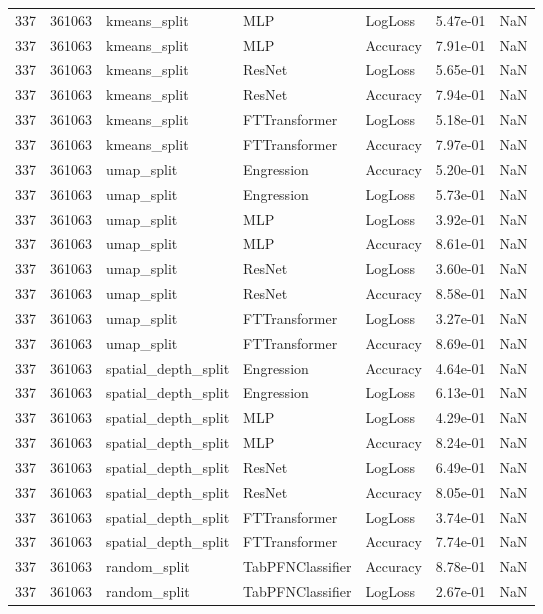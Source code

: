 \begin{tabular}{rrlllrr}
337 & 361063 & kmeans\_split & MLP & LogLoss & 5.47e-01 & NaN \\
337 & 361063 & kmeans\_split & MLP & Accuracy & 7.91e-01 & NaN \\
337 & 361063 & kmeans\_split & ResNet & LogLoss & 5.65e-01 & NaN \\
337 & 361063 & kmeans\_split & ResNet & Accuracy & 7.94e-01 & NaN \\
337 & 361063 & kmeans\_split & FTTransformer & LogLoss & 5.18e-01 & NaN \\
337 & 361063 & kmeans\_split & FTTransformer & Accuracy & 7.97e-01 & NaN \\
337 & 361063 & umap\_split & Engression & Accuracy & 5.20e-01 & NaN \\
337 & 361063 & umap\_split & Engression & LogLoss & 5.73e-01 & NaN \\
337 & 361063 & umap\_split & MLP & LogLoss & 3.92e-01 & NaN \\
337 & 361063 & umap\_split & MLP & Accuracy & 8.61e-01 & NaN \\
337 & 361063 & umap\_split & ResNet & LogLoss & 3.60e-01 & NaN \\
337 & 361063 & umap\_split & ResNet & Accuracy & 8.58e-01 & NaN \\
337 & 361063 & umap\_split & FTTransformer & LogLoss & 3.27e-01 & NaN \\
337 & 361063 & umap\_split & FTTransformer & Accuracy & 8.69e-01 & NaN \\
337 & 361063 & spatial\_depth\_split & Engression & Accuracy & 4.64e-01 & NaN \\
337 & 361063 & spatial\_depth\_split & Engression & LogLoss & 6.13e-01 & NaN \\
337 & 361063 & spatial\_depth\_split & MLP & LogLoss & 4.29e-01 & NaN \\
337 & 361063 & spatial\_depth\_split & MLP & Accuracy & 8.24e-01 & NaN \\
337 & 361063 & spatial\_depth\_split & ResNet & LogLoss & 6.49e-01 & NaN \\
337 & 361063 & spatial\_depth\_split & ResNet & Accuracy & 8.05e-01 & NaN \\
337 & 361063 & spatial\_depth\_split & FTTransformer & LogLoss & 3.74e-01 & NaN \\
337 & 361063 & spatial\_depth\_split & FTTransformer & Accuracy & 7.74e-01 & NaN \\
337 & 361063 & random\_split & TabPFNClassifier & Accuracy & 8.78e-01 & NaN \\
337 & 361063 & random\_split & TabPFNClassifier & LogLoss & 2.67e-01 & NaN \\

\end{tabular}

